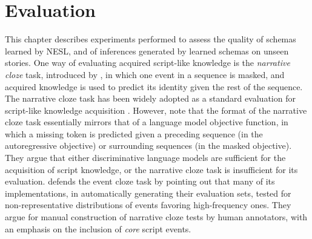 \chapter{Evaluation}

This chapter describes experiments performed to assess the quality of schemas learned by NESL, and of inferences generated by learned schemas on unseen stories.
One way of evaluating acquired script-like knowledge is the \textit{narrative cloze} task, introduced by \citet{chambers2008unsupervised}, in which one event in a sequence is masked, and acquired knowledge is used to predict its identity given the rest of the sequence.
The narrative cloze task has been widely adopted as a standard evaluation for script-like knowledge acquisition \citep{jans-etal-2012-skip,rudinger-etal-2015-learning,pichotta2016learning,lee-goldwasser-2019-multi}.
However, \citet{rudinger-etal-2015-learning} note that the format of the narrative cloze task essentially mirrors that of a language model objective function, in which a missing token is predicted given a preceding sequence (in the autoregressive objective) or surrounding sequences (in the masked objective).
They argue that either discriminative language models are sufficient for the acquisition of script knowledge, or the narrative cloze task is insufficient for its evaluation.
\citet{chambers-2017-behind} defends the event cloze task by pointing out that many of its implementations, in automatically generating their evaluation sets, tested for non-representative distributions of events favoring high-frequency ones.
They argue for manual construction of narrative cloze tests by human annotators, with an emphasis on the inclusion of \textit{core} script events.

